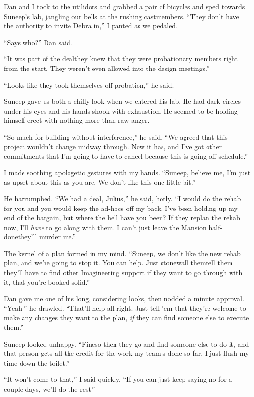Dan and I took to the utilidors and grabbed a pair of bicycles and
sped towards Suneep's lab, jangling our bells at the rushing
castmembers. “They don't have the authority to invite Debra in,” I
panted as we pedaled.

“Says who?” Dan said.

“It was part of the deal{\dash}they knew that they were probationary
members right from the start. They weren't even allowed into the
design meetings.”

“Looks like they took themselves off probation,” he said.

Suneep gave us both a chilly look when we entered his lab. He had
dark circles under his eyes and his hands shook with exhaustion. He
seemed to be holding himself erect with nothing more than raw
anger.

“So much for building without interference,” he said. “We agreed
that this project wouldn't change midway through. Now it has, and
I've got other commitments that I'm going to have to cancel because
this is going off-schedule.”

I made soothing apologetic gestures with my hands. “Suneep, believe
me, I'm just as upset about this as you are. We don't like this one
little bit.”

He harrumphed. “We had a deal, Julius,” he said, hotly. “I would do
the rehab for you and you would keep the ad-hocs off my back. I've
been holding up my end of the bargain, but where the hell have you
been? If they replan the rehab now, I'll \emph{have} to go along
with them. I can't just leave the Mansion half-done{\dash}they'll murder
me.”

The kernel of a plan formed in my mind. “Suneep, we don't like the
new rehab plan, and we're going to stop it. You can help. Just
stonewall them{\dash}tell them they'll have to find other Imagineering
support if they want to go through with it, that you're booked
solid.”

Dan gave me one of his long, considering looks, then nodded a
minute approval. “Yeah,” he drawled. “That'll help all right. Just
tell 'em that they're welcome to make any changes they want to the
plan, \emph{if} they can find someone else to execute them.”

Suneep looked unhappy. “Fine{\dash}so then they go and find someone else
to do it, and that person gets all the credit for the work my
team's done so far. I just flush my time down the toilet.”

“It won't come to that,” I said quickly. “If you can just keep
saying no for a couple days, we'll do the rest.”

